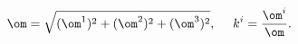 \begin{equation}                                        \label{enewvs}
  \om=\sqrt{(\om^1)^2+(\om^2)^2+(\om^3)^2},~~~~k^i=\frac{\om^i}\om.
\end{equation}

